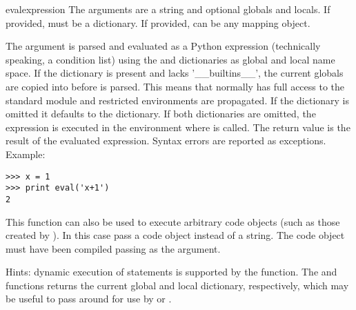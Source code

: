 \begin{funcdesc}{eval}{expression}
  The arguments are a string and optional globals and locals.  If provided,
   must be a dictionary.  If provided,  can be
  any mapping object.  

  The  argument is parsed and evaluated as a Python
  expression (technically speaking, a condition list) using the
   and  dictionaries as global and local name
  space.  If the  dictionary is present and lacks
  '__builtins__', the current globals are copied into  before
   is parsed.  This means that 
  normally has full access to the standard
   module and restricted environments
  are propagated.  If the  dictionary is omitted it defaults to
  the  dictionary.  If both dictionaries are omitted, the
  expression is executed in the environment where  is
  called.  The return value is the result of the evaluated expression.
  Syntax errors are reported as exceptions.  Example:

\begin{verbatim}
>>> x = 1
>>> print eval('x+1')
2
\end{verbatim}

  This function can also be used to execute arbitrary code objects
  (such as those created by ).  In this case pass
  a code object instead of a string.  The code object must have been
  compiled passing  as the  argument.

  Hints: dynamic execution of statements is supported by the
   function.  The
   and  functions returns the
  current global and local dictionary, respectively, which may be
  useful to pass around for use by  or
  .
\end{funcdesc}

